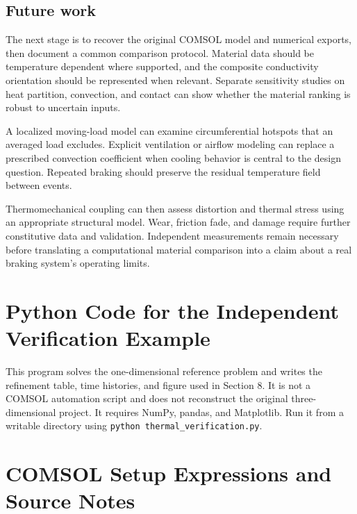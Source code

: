 \documentclass[11pt,a4paper]{article}
\begin{document}
\subsection{Future work}
The next stage is to recover the original COMSOL model and numerical exports, then document a common comparison protocol. Material data should be temperature dependent where supported, and the composite conductivity orientation should be represented when relevant. Separate sensitivity studies on heat partition, convection, and contact can show whether the material ranking is robust to uncertain inputs.

A localized moving-load model can examine circumferential hotspots that an averaged load excludes. Explicit ventilation or airflow modeling can replace a prescribed convection coefficient when cooling behavior is central to the design question. Repeated braking should preserve the residual temperature field between events.

Thermomechanical coupling can then assess distortion and thermal stress using an appropriate structural model. Wear, friction fade, and damage require further constitutive data and validation. Independent measurements remain necessary before translating a computational material comparison into a claim about a real braking system's operating limits.

\appendix\clearpage\section{Python Code for the Independent Verification Example}
This program solves the one-dimensional reference problem and writes the refinement table, time histories, and figure used in Section 8. It is not a COMSOL automation script and does not reconstruct the original three-dimensional project. It requires NumPy, pandas, and Matplotlib. Run it from a writable directory using \texttt{python thermal\_verification.py}.


\clearpage\section{COMSOL Setup Expressions and Source Notes}
\end{document}
